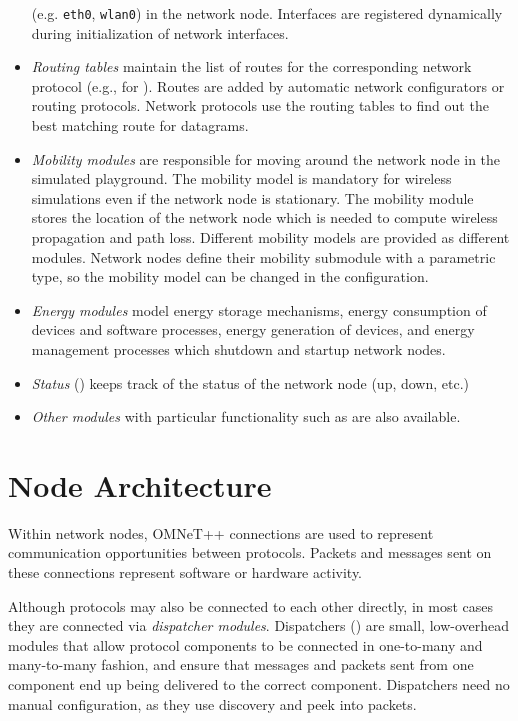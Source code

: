 \begin{itemize}
     (e.g. \texttt{eth0}, \texttt{wlan0}) in the network node. Interfaces
     are registered dynamically during initialization of network interfaces.
  \item \emph{Routing tables} maintain the list of routes for the corresponding
     network protocol (e.g.,  for ).
     Routes are added by automatic network configurators or routing protocols.
     Network protocols use the routing tables to find out the best matching
     route for datagrams.
  \item \emph{Mobility modules} are responsible for moving around the network
     node in the simulated playground. The mobility model is mandatory for
     wireless simulations even if the network node is stationary. The mobility
     module stores the location of the network node which is needed to compute
     wireless propagation and path loss. Different mobility models are provided
     as different modules. Network nodes define their mobility submodule with
     a parametric type, so the mobility model can be changed in the configuration.
  \item \emph{Energy modules} model energy storage mechanisms, energy
     consumption of devices and software processes, energy generation of devices,
     and energy management processes which shutdown and startup network nodes.
  \item \emph{Status} () keeps track of the status of the
     network node (up, down, etc.)
  \item \emph{Other modules} with particular functionality such as
      are also available.
\end{itemize}

\section{Node Architecture}
\label{sec:nodes:node-architecture}

Within network nodes, OMNeT++ connections are used to represent
communication opportunities between protocols. Packets and
messages sent on these connections represent software or hardware activity.

Although protocols may also be connected to each other directly,
in most cases they are connected via \emph{dispatcher modules}.
Dispatchers () are small, low-overhead modules
that allow protocol components to be connected in one-to-many and many-to-many
fashion, and ensure that messages and packets sent from one component end up
being delivered to the correct component. Dispatchers need no manual
configuration, as they use discovery and peek into packets.

